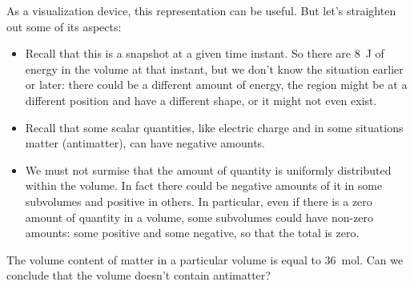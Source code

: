 \documentclass[a4paper,12pt,%
onecolumn,oneside,titlepage,%
british%
]{memoir}
\renewcommand*{\|}[1][]{\nonscript\:#1\vert\nonscript\:\mathopen{}}
\begin{document}
As a visualization device, this representation can be useful. But let's straighten out some of its aspects:
\begin{itemize}[para]
\item Recall that this is a snapshot at a given time instant. So there are \qty{8}{J} of energy in the volume at that instant, but we don't know the situation earlier or later: there could be a different amount of energy, the region might be at a different position and have a different shape, or it might not even exist.

\item Recall that some scalar quantities, like electric charge and in some situations matter (antimatter), can have negative amounts.

\item We must not surmise that the amount of quantity is uniformly distributed within the volume. In fact there could be negative amounts of it in some subvolumes and positive in others. In particular,  even if there is a zero amount of quantity in a volume, some subvolumes could have non-zero amounts: some positive and some negative, so that the total is zero.
\end{itemize}

\bigskip

\begin{exercise}
  The volume content of matter in a particular volume is equal to \qty{36}{mol}. Can we conclude that the volume doesn't contain antimatter?
\end{exercise}
\end{document}
